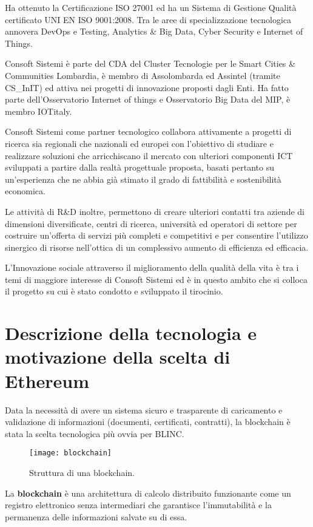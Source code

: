 Ha ottenuto la Certificazione ISO 27001 ed ha un Sistema di Gestione Qualità certificato UNI EN ISO 9001:2008.
Tra le aree di specializzazione tecnologica
annovera DevOps e Testing, Analytics \& Big Data, Cyber Security e Internet of Things.

Consoft Sistemi è parte del CDA del Cluster Tecnologie
per le Smart Cities \& Communities Lombardia, è membro di Assolombarda ed Assintel
(tramite CS\_InIT) ed attiva nei progetti di innovazione proposti dagli Enti.
Ha fatto parte dell’Osservatorio Internet of things e Osservatorio Big Data del MIP, è membro IOTitaly.

Consoft Sistemi come partner tecnologico collabora attivamente a progetti di ricerca sia regionali che nazionali
ed europei con l’obiettivo di studiare e realizzare soluzioni che arricchiscano il mercato con ulteriori
componenti ICT sviluppati a partire dalla realtà progettuale proposta,
basati pertanto su un'esperienza che ne abbia già stimato il grado di fattibilità e sostenibilità economica.

Le attività di R\&D inoltre, permettono di creare ulteriori contatti tra aziende di dimensioni diversificate, centri di ricerca,
università ed operatori di settore per costruire un’offerta di servizi più completi e competitivi e per consentire l’utilizzo sinergico di risorse
nell'ottica di un complessivo aumento di efficienza ed efficacia.

L’Innovazione sociale attraverso il miglioramento della qualità della vita è tra i temi di maggiore interesse di Consoft
Sistemi ed è in questo ambito
che si colloca il progetto su cui è stato condotto e sviluppato il tirocinio.

\section{Descrizione della tecnologia e motivazione della scelta di Ethereum}

Data la necessità di avere un sistema sicuro e trasparente di caricamento e validazione di informazioni
(documenti, certificati, contratti),
la blockchain è stata la scelta tecnologica più ovvia per BLINC.

\begin{figure}[h!]
    \texttt{[image: blockchain]}
    \caption{Struttura di una blockchain.}
    \label{fig:blockchain}
\end{figure}

La \textbf{blockchain} è una architettura di calcolo distribuito funzionante come un registro elettronico senza intermediari
che garantisce l’immutabilità e la permanenza delle informazioni salvate su di essa.

